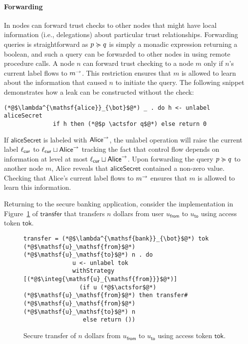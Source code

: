 \paragraph{Forwarding}
In \lang{} nodes can forward trust checks to other nodes that might have local information (i.e., delegations) about particular trust relationships. Forwarding queries is straightforward as $p \succcurlyeq q$ is simply a monadic expression returning a boolean, and such a query can be forwarded to other nodes in \lang{} using remote procedure calls.
A node $n$ can forward trust checking to a node $m$ only if $n$'s current label flows to $m^{\rightarrow}$. This restriction ensures that $m$ is allowed to learn about the information that caused $n$ to initiate the query.  The following snippet demonstrates how a leak can be constructed without the check:
\begin{lstlisting}
(*@$\lambda^{\mathsf{alice}}_{\bot}$@*) _ . do h <- unlabel aliceSecret
              if h then (*@$p \actsfor q$@*) else return 0
\end{lstlisting}
If $\mathsf{aliceSecret}$ is labeled with $\mathsf{Alice}^{\rightarrow}$, the unlabel operation will raise the current label $\ell_{\mathsf{cur}}$ to $\ell_{\mathsf{cur}} \sqcup \mathsf{Alice}^{\rightarrow}$ tracking the fact that control flow depends on information at level at most $\ell_{\mathsf{cur}} \sqcup \mathsf{Alice}^{\rightarrow}$. Upon forwarding the query $p \succcurlyeq q$ to another node $m$, Alice reveals that $\mathsf{aliceSecret}$ contained a non-zero value. Checking that Alice's current label flows to $m^{\rightarrow}$ ensures that $m$ is allowed to learn this information.

Returning to the secure banking application, consider the implementation in Figure~\ref{fig:sec-transfer} of $\mathsf{transfer}$ that transfers $n$ dollars from user $u_\mathsf{from}$ to $u_\mathsf{to}$ using access token $\mathsf{tok}$.

\begin{figure}
\centering
\begin{lstlisting}
transfer = (*@$\lambda^{\mathsf{bank}}_{\bot}$@*) tok (*@$\mathsf{u}_\mathsf{from}$@*) (*@$\mathsf{u}_\mathsf{to}$@*) n . do
              u <- unlabel tok
              withStrategy [(*@$\integ{\mathsf{u}_{\mathsf{from}}}$@*)]
                (if u (*@$\actsfor$@*) (*@$\mathsf{u}_\mathsf{from}$@*) then transfer# (*@$\mathsf{u}_\mathsf{from}$@*) (*@$\mathsf{u}_\mathsf{to}$@*) n
                 else return ())
\end{lstlisting}
\caption{Secure transfer of $n$ dollars from $u_{\mathsf{from}}$ to $u_{\mathsf{to}}$ using access token $\mathsf{tok}$.}
\label{fig:sec-transfer}
\end{figure}

